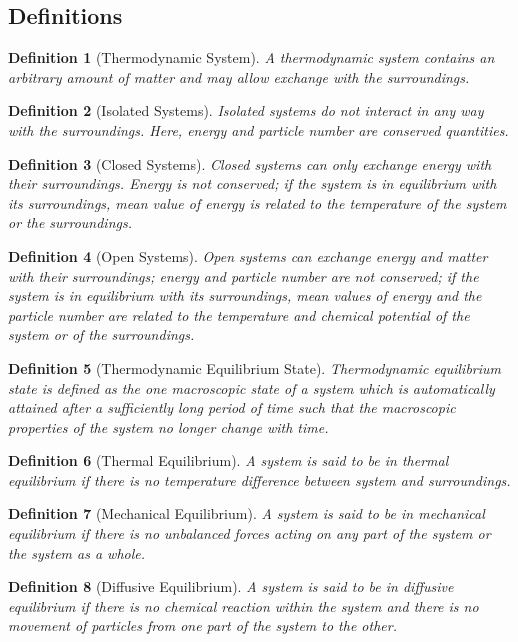 \documentclass[a4paper]{article}
\theoremstyle{new}
\newtheorem{defi}{Definition}[section]
\begin{document}
\subsection{Definitions}
\begin{defi}[Thermodynamic System]
A thermodynamic system contains an arbitrary amount of matter and may allow exchange with the surroundings.
\end{defi}
\begin{defi}[Isolated Systems]
Isolated systems do not interact in any way with the surroundings. Here, energy and particle number are conserved quantities. 
\end{defi}
\begin{defi}[Closed Systems]
Closed systems can only exchange energy with their surroundings. Energy is not conserved; if the system is in equilibrium with its surroundings, mean value of energy is related to the temperature of the system or the surroundings.
\end{defi}
\begin{defi}[Open Systems]
Open systems can exchange energy and matter with their surroundings; energy and particle number are not conserved; if the system is in equilibrium with its surroundings, mean values of energy and the particle number are related to the temperature and chemical potential of the system or of the surroundings.
\end{defi}
\begin{defi}[Thermodynamic Equilibrium State]
Thermodynamic equilibrium state is defined as the one macroscopic state of a system which is automatically attained after a sufficiently long period of time such that the macroscopic properties of the system no longer change with time.
\end{defi}
\begin{defi}[Thermal Equilibrium]
A system is said to be in thermal equilibrium if there is no temperature difference between system and surroundings.
\end{defi}
\begin{defi}[Mechanical Equilibrium]
A system is said to be in mechanical equilibrium if there is no unbalanced forces acting on any part of the system or the system as a whole.
\end{defi}
\begin{defi}[Diffusive Equilibrium]
A system is said to be in diffusive equilibrium if there is no chemical reaction within the system and there is no movement of particles from one part of the system to the other.
\end{defi}
\end{document}
